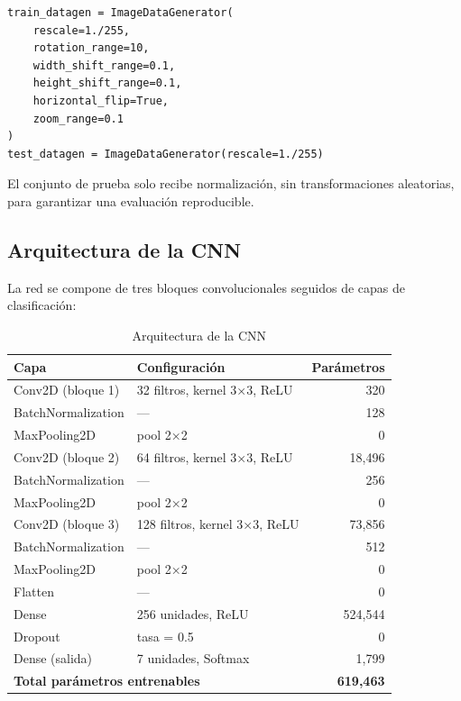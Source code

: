 \documentclass[12pt, a4paper]{article}
\begin{document}
\begin{lstlisting}[style=python]
train_datagen = ImageDataGenerator(
    rescale=1./255,
    rotation_range=10,
    width_shift_range=0.1,
    height_shift_range=0.1,
    horizontal_flip=True,
    zoom_range=0.1
)
test_datagen = ImageDataGenerator(rescale=1./255)
\end{lstlisting}

El conjunto de prueba solo recibe normalización, sin transformaciones aleatorias, para garantizar
una evaluación reproducible.

\subsection{Arquitectura de la CNN}

La red se compone de tres bloques convolucionales seguidos de capas de clasificación:

\begin{table}[H]
  \centering
  \caption{Arquitectura de la CNN}
  \begin{tabular}{llr}
    \toprule
    \textbf{Capa} & \textbf{Configuración} & \textbf{Parámetros} \\
    \midrule
    Conv2D (bloque 1)        & 32 filtros, kernel 3×3, ReLU  & 320 \\
    BatchNormalization        & —                             & 128 \\
    MaxPooling2D              & pool 2×2                      & 0   \\
    Conv2D (bloque 2)        & 64 filtros, kernel 3×3, ReLU  & 18,496 \\
    BatchNormalization        & —                             & 256 \\
    MaxPooling2D              & pool 2×2                      & 0   \\
    Conv2D (bloque 3)        & 128 filtros, kernel 3×3, ReLU & 73,856 \\
    BatchNormalization        & —                             & 512 \\
    MaxPooling2D              & pool 2×2                      & 0   \\
    Flatten                   & —                             & 0   \\
    Dense                     & 256 unidades, ReLU            & 524,544 \\
    Dropout                   & tasa = 0.5                    & 0   \\
    Dense (salida)            & 7 unidades, Softmax           & 1,799 \\
    \midrule
    \multicolumn{2}{l}{\textbf{Total parámetros entrenables}} & \textbf{619,463} \\
    \bottomrule
  \end{tabular}
\end{table}
\end{document}
